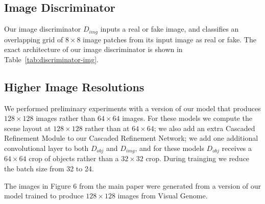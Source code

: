 \documentclass[10pt,twocolumn,letterpaper]{article}
\begin{document}
\subsection{Image Discriminator}
Our image discriminator $D_{img}$ inputs a real or fake image, and classifies an
overlapping grid of $8\times8$ image patches from its input image as real or fake.
The exact architecture of our image discriminator is shown in Table~\ref{tab:discriminator-img}.

\subsection{Higher Image Resolutions}
We performed preliminary experiments with a version of our model that produces $128\times128$
images rather than $64\times64$ images. For these models we compute the scene layout at $128\times128$
rather than at $64\times64$; we also add an extra Cascaded Refinement Module to our Cascaded Refinement
Network; we add one additional convolutional layer to both $D_{obj}$ and $D_{img}$, and for these
models $D_{obj}$ receives a $64\times64$ crop of objects rather than a $32\times32$ crop. During trainging
we reduce the batch size from 32 to 24.

The images in Figure 6 from the main paper were generated from a version of our model trained to
produce $128\times128$ images from Visual Genome.

\begin{table}
  \centering
  \setlength{\tabcolsep}{1mm}
  \vspace{1mm}
  \caption{
    Architecture of our image discriminator $D_{img}$. The input to the image discriminator
    is either a real or fake image, and it classifies an overlapping $8\times8$ grid of
    patches in the input image as either real or fake. All but the final convolution have
    a stride of 2, and all convolutions use no padding. LeakyReLU uses a negative slope of 0.2.
  }
  \label{tab:discriminator-img}
\end{table}
\end{document}
